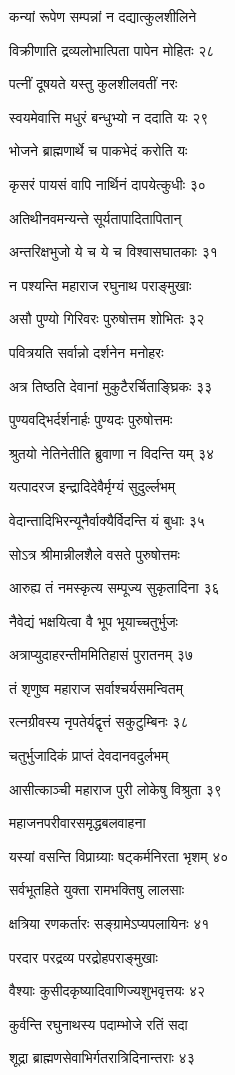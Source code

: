 कन्यां रूपेण सम्पन्नां न दद्यात्कुलशीलिने

विक्रीणाति द्रव्यलोभात्पिता पापेन मोहितः २८

पत्नीं दूषयते यस्तु कुलशीलवतीं नरः

स्वयमेवात्ति मधुरं बन्धुभ्यो न ददाति यः २९

भोजने ब्राह्मणार्थे च पाकभेदं करोति यः

कृसरं पायसं वापि नार्थिनं दापयेत्कुधीः ३०

अतिथीनवमन्यन्ते सूर्यतापादितापितान्

अन्तरिक्षभुजो ये च ये च विश्वासघातकाः ३१

न पश्यन्ति महाराज रघुनाथ पराङ्मुखाः

असौ पुण्यो गिरिवरः पुरुषोत्तम शोभितः ३२

पवित्रयति सर्वान्नो दर्शनेन मनोहरः

अत्र तिष्ठति देवानां मुकुटैरर्चिताङ्घ्रिकः ३३

पुण्यवद्भिर्दर्शनार्हः पुण्यदः पुरुषोत्तमः

श्रुतयो नेतिनेतीति ब्रुवाणा न विदन्ति यम् ३४

यत्पादरज इन्द्रादिदेवैर्मृग्यं सुदुर्ल्लभम्

वेदान्तादिभिरन्यूनैर्वाक्यैर्विदन्ति यं बुधाः ३५

सोऽत्र श्रीमान्नीलशैले वसते पुरुषोत्तमः

आरुह्य तं नमस्कृत्य सम्पूज्य सुकृतादिना ३६

नैवेद्यं भक्षयित्वा वै भूप भूयाच्चतुर्भुजः

अत्राप्युदाहरन्तीममितिहासं पुरातनम् ३७

तं शृणुष्व महाराज सर्वाश्चर्यसमन्वितम्

रत्नग्रीवस्य नृपतेर्यद्वृत्तं सकुटुम्बिनः ३८

चतुर्भुजादिकं प्राप्तं देवदानवदुर्लभम्

आसीत्काञ्ची महाराज पुरी लोकेषु विश्रुता ३९

महाजनपरीवारसमृद्धबलवाहना

यस्यां वसन्ति विप्राग्र्याः षट्कर्मनिरता भृशम् ४०

सर्वभूतहिते युक्ता रामभक्तिषु लालसाः

क्षत्रिया रणकर्तारः सङ्ग्रामेऽप्यपलायिनः ४१

परदार परद्रव्य परद्रोहपराङ्मुखाः

वैश्याः कुसीदकृष्यादिवाणिज्यशुभवृत्तयः ४२

कुर्वन्ति रघुनाथस्य पदाम्भोजे रतिं सदा

शूद्रा ब्राह्मणसेवाभिर्गतरात्रिदिनान्तराः ४३

